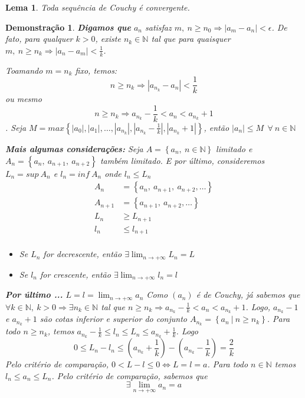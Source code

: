 \documentclass[12pt,openany, letterpaper]{book}
\newtheorem{lemma}{Lema}[section]
\newtheorem{demonstration}{Demonstração}
\begin{document}
\begin{lemma}
Toda sequência de Couchy é convergente. 
\end{lemma}

\begin{demonstration}
\textbf{Digamos que} $a_n$ satisfaz $m, \ n \geq n_0 \Rightarrow |a_m - a_n| < \epsilon$. De fato, para qualquer $k > 0$, existe $n_k \in \mathds{N}$ tal que para quaisquer $ m, \ n \geq n_k \Rightarrow |a_n - a_m| < \displaystyle{\frac{1}{k}}$.

Toamando $m = n_k$ fixo, temos: $$ n \geq n_k \Rightarrow |a_{n_k} - a_n| < \frac{1}{k} $$ ou mesmo $$ n \geq n_k \Rightarrow a_{n_k} - \frac{1}{k} < a_n < a_{n_k} + 1 $$. Seja $M = max\left\{ |a_0|, |a_1|, \hdots , |a_{n_k}|, |a_{n_k} - \frac{1}{k}|, |a_{n_k} + 1| \right\}$, então $|a_n| \leq M \ \ \forall \ n \in \mathds{N}$

\textbf{Mais algumas considerações:} Seja $A = \left\{ a_n, \ n \in \mathds{N} \right\}$ limitado e $A_n = \left\{ a_n, \ a_{n+1}, \ a_{n+2} \right\}$ também limitado. E por último, consideremos $L_n = sup \ A_n$ e $l_n = inf \ A_n$ onde $l_n \leq L_n$
\begin{align*}
A_n &= \left\{ a_n, \ a_{n+1}, \ a_{n+2}, \hdots \right\} \\
A_{n+1} &= \left\{ a_{n+1}, \ a_{n+2}, \hdots \right\} \\
L_n  &\geq L_{n+1} \\
l_n & \leq l_{n+1} \\
\end{align*}
\begin{itemize}
\item Se $L_n$ for decrescente, então $\displaystyle{\exists \lim_{n \rightarrow +\infty} L_n = L}$
\item Se $l_n$ for crescente, então $\displaystyle{\exists \lim_{n \rightarrow +\infty} l_n = l}$
\end{itemize}
\textbf{Por último ...} $\displaystyle{L = l = \lim_{n \rightarrow +\infty} a_n}$ Como $(a_n)$ é de Couchy, já sabemos que $\forall k \in \mathds{N}, \ k > 0 \Rightarrow \exists n_k \in \mathds{N}$ tal que $n \geq n_k \Rightarrow a_{n_k} - \frac{1}{k} < a_n < a_{n_k} + 1$. Logo, $a_{n_k} - 1 $ e $a_{n_k} + 1 $ são cotas inferior e superior do conjunto $A_{n_k} = \left\{ a_n \ | \ n \geq n_k \right\}$. Para todo $n \geq n_k$, temos $a_{n_k} - \frac{1}{k} \leq l_n \leq L_n \leq a_{n_k} + \frac{1}{k}$. Logo $$ 0 \leq L_n - l_n \leq (a_{n_k} + \frac{1}{k}) - (a_{n_k} - \frac{1}{k}) = \frac{2}{k}$$ Pelo critério de comparação, $ 0 < L - l \leq 0 \Longleftrightarrow L = l = a $. Para todo $n \in \mathds{N}$ temos $ l_n \leq a_n \leq L_n$. Pelo critério de comparação, sabemos que $$ \exists \lim_{n \rightarrow +\infty} a_n = a $$
\end{demonstration}
\end{document}
